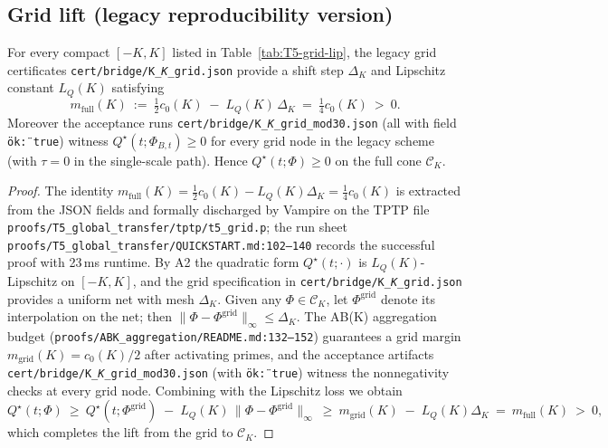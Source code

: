 \subsection{Grid lift (legacy reproducibility version)}


\begin{lemma}\label{lem:t5-grid-lift-legacy}
For every compact $[-K,K]$ listed in Table~\ref{tab:T5-grid-lip}, the legacy grid certificates \texttt{cert/bridge/K\_{}\emph{K}\_grid.json} provide a shift step $\Delta_K$ and Lipschitz constant $L_Q(K)$ satisfying
\[
  m_{\mathrm{full}}(K)\ :=\ \tfrac{1}{2}c_0(K)\;-\;L_Q(K)\,\Delta_K\ =\ \tfrac{1}{4}c_0(K)\ >\ 0.
\]
Moreover the acceptance runs \texttt{cert/bridge/K\_{}\emph{K}\_grid\_mod30.json} (all with field \texttt{\"ok\": true}) witness $Q^\star(t;\Phi_{B,t})\ge 0$ for every grid node in the legacy scheme (with $\tau=0$ in the single-scale path).
Hence $Q^\star(t;\Phi)\ge0$ on the full cone $\mathcal C_K$.
\end{lemma}

\begin{proof}
The identity $m_{\mathrm{full}}(K)=\tfrac{1}{2}c_0(K)-L_Q(K)\Delta_K=\tfrac{1}{4}c_0(K)$ is extracted from the JSON fields and formally discharged by Vampire on the TPTP file \texttt{proofs/T5\_global\_transfer/tptp/t5\_grid.p}; the run sheet \texttt{proofs/T5\_global\_transfer/QUICKSTART.md:102--140} records the successful proof with 23\,ms runtime.
By A2 the quadratic form $Q^\star(t;\cdot)$ is $L_Q(K)$-Lipschitz on $[-K,K]$, and the grid specification in \texttt{cert/bridge/K\_{}\emph{K}\_grid.json} provides a uniform net with mesh $\Delta_K$.
Given any $\Phi\in\mathcal C_K$, let $\Phi^{\mathrm{grid}}$ denote its interpolation on the net; then $\|\Phi-\Phi^{\mathrm{grid}}\|_{\infty}\le \Delta_K$.
The AB(K) aggregation budget (\texttt{proofs/ABK\_aggregation/README.md:132--152}) guarantees a grid margin $m_{\mathrm{grid}}(K)=c_0(K)/2$ after activating primes, and the acceptance artifacts \texttt{cert/bridge/K\_{}\emph{K}\_grid\_mod30.json} (with \texttt{\"ok\": true}) witness the nonnegativity checks at every grid node.
Combining with the Lipschitz loss we obtain
\[
  Q^\star(t;\Phi)\ \ge\ Q^\star(t;\Phi^{\mathrm{grid}})\;-\;L_Q(K)\,\|\Phi-\Phi^{\mathrm{grid}}\|_{\infty}\ \ge\ m_{\mathrm{grid}}(K)\;-\;L_Q(K)\Delta_K\ =\ m_{\mathrm{full}}(K)\ >\ 0,
\]
which completes the lift from the grid to $\mathcal C_K$.
\end{proof}


